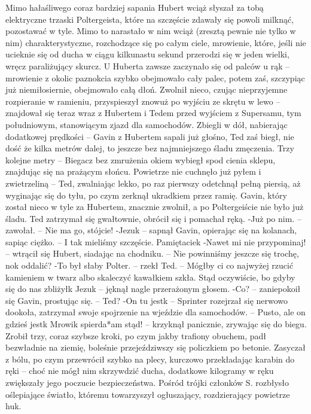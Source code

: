 \documentclass[../MAIN.tex]{subfiles}
\begin{document}
Mimo hałaśliwego coraz bardziej sapania Hubert wciąż słyszał za tobą elektryczne trzaski Poltergeista, które na szczęście zdawały się powoli milknąć, pozostawać w tyle. Mimo to narastało w nim wciąż (zresztą pewnie nie tylko w nim) charakterystyczne, rozchodzące się po całym ciele, mrowienie, które, jeśli nie ucieknie się od ducha w ciągu kilkunastu sekund przerodzi się w jeden wielki, wręcz paraliżujący skurcz. U Huberta zawsze zaczynało się od palców u rąk -- mrowienie z okolic paznokcia szybko obejmowało cały palec, potem zaś, szczypiąc już niemiłosiernie, obejmowało całą dłoń.
Zwolnił nieco, czując nieprzyjemne rozpieranie w ramieniu, przyspieszył znowuż po wyjściu ze skrętu w lewo -- znajdował się teraz wraz z Hubertem i Tedem przed wyjściem z Supersamu, tym południowym, stanowiącym zjazd dla samochodów. Zbiegli w dół, nabierając dodatkowej prędkości -- Gavin z Hubertem sapali już głośno, Ted zaś biegł, nie dość że kilka metrów dalej, to jeszcze bez najmniejszego śladu zmęczenia.
Trzy kolejne metry -- Biegacz bez zmrużenia okiem wybiegł spod cienia sklepu, znajdując się na prażącym słońcu. Powietrze nie cuchnęło już pyłem i zwietrzeliną -- Ted, zwalniając lekko, po raz pierwszy odetchnął pełną piersią, aż wyginając się do tyłu, po czym zerknął ukradkiem przez ramię.
Gavin, który został nieco w tyle za Hubertem, znacznie zwolnił, a po Poltergeiście nie było już śladu. Ted zatrzymał się gwałtownie, obrócił się i pomachał ręką.
-Już po nim. -- zawołał. -- Nie ma go, stójcie!
-Jezu\3k -- sapnął Gavin, opierając się na kolanach, sapiąc ciężko. -- I tak mieliśmy szczęście. Pamiętacie\3k
-Nawet mi nie przypominaj! -- wtrącił się Hubert, siadając na chodniku. -- Nie powinniśmy jeszcze się trochę, no\3k oddalić?
-To był słaby Polter. -- rzekł Ted. -- Mógłby ci co najwyżej rzucić kamieniem w twarz albo skaleczyć kawałkiem szkła. Stąd oczywiście, bo gdyby się do nas zbliżył\3k Jezu\3k -- jęknął nagle przerażonym głosem.
-Co? -- zaniepokoił się Gavin, prostując się. -- Ted?
-On tu jest\3k -- Sprinter rozejrzał się nerwowo dookoła, zatrzymał swoje spojrzenie na wjeździe dla samochodów. -- Pusto, ale on gdzieś jest\3k Mrowi\3k spierda*am stąd! -- krzyknął panicznie, zrywając się do biegu. Zrobił trzy, coraz szybsze kroki, po czym jakby trafiony obuchem, padł bezwładnie na ziemię, boleśnie przejeździwszy się policzkiem po betonie. Zasyczał z bólu, po czym przewrócił szybko na plecy, kurczowo przekładając karabin do ręki -- choć nie mógł nim skrzywdzić ducha, dodatkowe kilogramy w ręku zwiększały jego poczucie bezpieczeństwa.
Pośród trójki członków S. rozbłysło oślepiające światło, któremu towarzyszył ogłuszający, rozdzierający powietrze huk.
\end{document}

